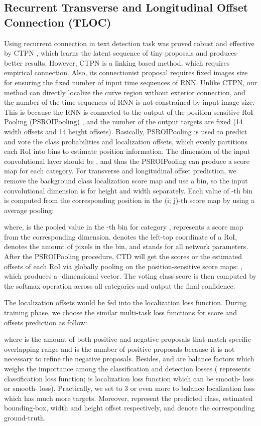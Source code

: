 \documentclass[10pt,twocolumn,letterpaper]{article}
\begin{document}
\subsection{Recurrent Transverse and Longitudinal Offset Connection (TLOC)}
Using recurrent connection in text detection task was proved robust and effective by CTPN \cite{tian2016detecting}, which learns the latent sequence of tiny proposals and produces better results. However, CTPN is a linking based method, which requires empirical connection. Also, its connectionist proposal requires fixed images size for ensuring the fixed number of input time sequences of RNN.
Unlike CTPN, our method can directly localize the curve region without exterior connection, and the number of the time sequences of RNN is not constrained by input image size. This is because the RNN is connected to the output of the position-sensitive RoI Pooling (PSROIPooling) \cite{dai2016r}, and the number of the output targets are fixed (14 width offsets and 14 height offsets).
Basically, PSROIPooling is used to predict and vote the class probabilities and localization offsets, which evenly partitions each RoI into  bins to estimate position information. The dimension of the input convolutional layer should be , and thus the PSROIPooling can produce a  score map for each category. For transverse and longitudinal offset prediction, we remove the background class localization score map and use a  bin, so the input convolutional dimension is  for height and width separately. Each value of -th bin  is computed from the corresponding position in the (i; j)-th score map by using a average pooling:

where,  is the pooled value in the -th bin for category ,  represents a score map from the corresponding dimension.  denotes the left-top coordinate of a RoI,  denotes the amount of pixels in the bin, and  stands for all network parameters. After the PSROIPooling procedure, CTD will get the scores or the estimated offsets of each RoI via globally pooling on the  position-sensitive score maps: , which produces a -dimensional vector.
The voting class score is then computed by the softmax operation across all categories and output the final confidence:

The localization offsets would be fed into the localization loss function. During training phase, we choose the similar multi-task loss functions for score and offsets prediction as follow:

where  is the amount of both positive and negative proposals that match specific overlapping range and  is the number of positive proposals because it is not necessary to refine the negative proposals. Besides,  and  are balance factors which weighs the importance among the classification and detection losses ( represents classification loss function;  is localization loss function which can be smooth- loss or smooth-\cite{liu2017deep} loss). Practically, we set  to 3 or even more to balance localization loss which has much more targets. Moreover,  represent the predicted class, estimated bounding-box, width and height offset respectively, and  denote the corresponding ground-truth.
\end{document}
